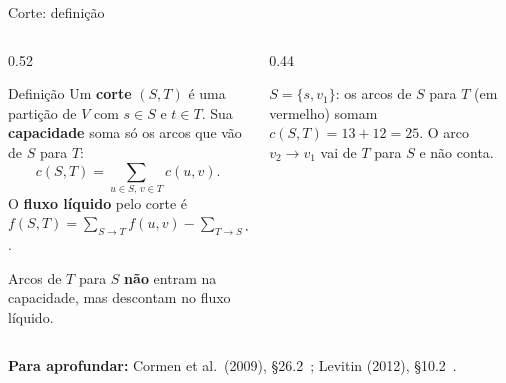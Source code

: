 \documentclass[aspectratio=169,xcolor=table]{beamer}
\newcommand{\nosrede}[1]{%
  \node[vert] (s)  at (0,0)     {$s$};
  \node[vert] (v1) at (1.7,1)   {$v_1$};
  \node[vert] (v2) at (1.7,-1)  {$v_2$};
  \node[vert] (v3) at (3.6,1)   {$v_3$};
  \node[vert] (v4) at (3.6,-1)  {$v_4$};
  \node[vert] (t)  at (5.3,0)   {$t$};
  \def\lista{#1}\ifx\lista\empty\else
    \foreach \v/\n in {#1} \node[vS] at (\v) {$\n$};\fi
}
\newcommand{\rede}[2]{%
  \nosrede{#2}
  \edef\arcosR{#1}
  \foreach \u/\v/\l/\e in \arcosR \draw[\e] (\u) to (\v);
  \foreach \u/\v/\l/\e in \arcosR \path (\u) to node[peso] {\l} (\v);
}
\newcommand{\fonte}[1]{%
  \vfill
  {\tiny\color{gray!55!black}\textbf{Para aprofundar:} #1\par}%
}
\begin{document}
\begin{frame}{Corte: definição}
  \begin{columns}[c]
    \begin{column}{0.52\textwidth}
      \begin{block}{Definição}
        \small
        Um \textbf{corte} $(S, T)$ é uma partição de $V$ com $s \in S$ e $t \in T$. Sua
        \textbf{capacidade} soma só os arcos que vão de $S$ para $T$:
        \[ c(S,T) = \sum_{u \in S,\, v \in T} c(u,v). \]
        O \textbf{fluxo líquido} pelo corte é
        $f(S,T) = \sum_{S \to T} f(u,v) - \sum_{T \to S} f(v,u)$.
      \end{block}
      \scriptsize
      Arcos de $T$ para $S$ \textbf{não} entram na capacidade, mas descontam no fluxo
      líquido.
    \end{column}
    \begin{column}{0.44\textwidth}
      \begin{center}
      \end{center}
      \scriptsize
      $S = \{s, v_1\}$: os arcos de $S$ para $T$ (em vermelho) somam
      $c(S,T) = 13 + 12 = 25$. O arco $v_2 \to v_1$ vai de $T$ para $S$ e não conta.
    \end{column}
  \end{columns}
  \fonte{Cormen et al.\ (2009), \S 26.2~\cite{cormen2009introduction};
    Levitin (2012), \S 10.2~\cite{levitin2012introduction}.}
\end{frame}
\end{document}
